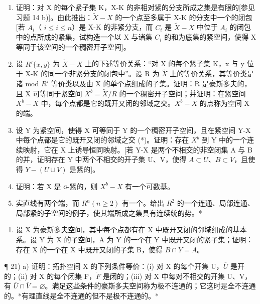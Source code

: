 \begin{enumerate}
\def\labelenumi{\alph{enumi})}
\item
  证明：对 X 的每个紧子集 K，X-K 的非相对紧的分支所成之集是有限的{[}参见习题 14 b){]}。由此推出：\(\tilde{X} - X\) 的一个点至多属于 X-K 的分支中一个的闭包{[}若 \(A_i\)（ \(i \leqslant i \leqslant n\)）是 X-K 的非紧分支，而 \(C_i\) 是 \(\tilde{X} - X\) 中位于 \(A_i\) 的闭包中的点所成的紧集，试构造一个以 X 与诸集 \(C_i\) 的和为底集的紧空间，使得 X 等同于该空间的一个稠密开子空间{]}。
\item
  设 \(R'\{x, y\}\) 为 \(\tilde{X}-X\) 上的下述等价关系：“对 X 的每个紧子集 K，x 与 y 位于 X-K 的同一个非紧分支的闭包中”。设 R 为 \(\tilde{X}\) 上的等价关系，其等价类是诸 mod \(R'\) 等价类以及由 X 的单个点组成的子集。证明：R 是豪斯多夫的，且 X 可等同于紧空间 \(X^{b}=\tilde{X}/R\) 的一个稠密开子空间；并证明：在紧空间 \(X^{b}-X\) 中，每个点都是它的既开又闭的邻域之交。\(X^{b}-X\) 的点称为空间 X 的端。
\item
  设 Y 为紧空间，使得 X 可等同于 Y 的一个稠密开子空间，且在紧空间 Y-X 中每个点都是它的既开又闭的邻域之交 (*)。证明：存在 \(X^{b}\) 到 Y 中的一个连续映射，它在 X 上诱导恒同映射。{[}若 Y-X 是两个不相交的非空闭集 A 与 B 的并，证明存在 Y 中两个不相交的开子集 U、V，使得 \(A \subset U\)、\(B \subset V\)，且使得 \(Y - (U \cup V)\) 是紧的{]}。
\item
  证明：若 X 是 σ-紧的，则 \(X^{b}-X\) 有一个可数基。
\item
  实直线有两个端，而 \(R^{n} (n \geqslant 2)\) 有一个。给出 \(R^{2}\) 的一个连通、局部连通、局部紧的子空间的例子，使其端所成之集具有连续统的势。*
\end{enumerate}

\begin{enumerate}
\def\labelenumi{\arabic{enumi})}
\setcounter{enumi}{19}
\tightlist
\item
  设 X 为豪斯多夫空间，其中每个点都有在 X 中既开又闭的邻域组成的基本系。设 Y 为 X 的子空间，A 为 Y 的一个在 Y 中既开又闭的紧子集；证明：存在 X 的一个在 X 中既开又闭的子集 B，使得 \(B \cap Y = A\)。
\end{enumerate}

¶ 21) a) 证明：拓扑空间 X 的下列条件等价：(i) 对 X 的每个开集 U，\(\overline{U}\) 是开的；(ii) 对 X 的每个闭集 F，\(\dot{F}\) 是闭的；(iii) 对 X 中每对不相交的开集 U、V，有 \(\overline{U} \cap \overline{V} = \varnothing\)。满足这些条件的豪斯多夫空间称为极不连通的；它这时是全不连通的。*有理直线是全不连通的但不是极不连通的。*


